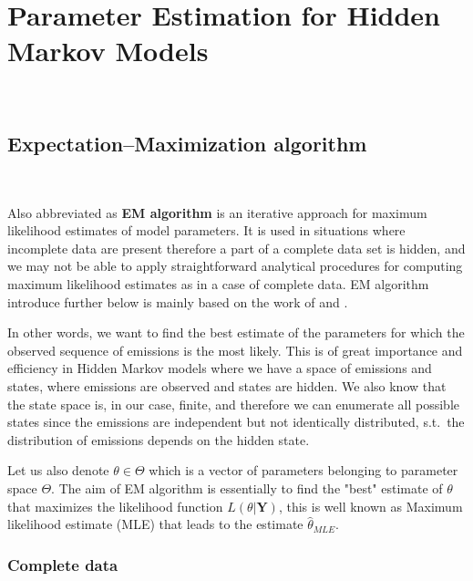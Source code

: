 
\chapter{Parameter Estimation for Hidden Markov Models}~\label{chapter:parameter_estimation}

\ifpdf
    \graphicspath{{Chapter2/Figs/Raster/}{Chapter2/Figs/PDF/}{Chapter2/Figs/}}
\else
    \graphicspath{{Chapter2/Figs/Vector/}{Chapter2/Figs/}}
\fi

\section{Expectation–Maximization algorithm}~\label{sec:EM}
 
Also abbreviated as \textbf{EM algorithm} is an iterative approach for maximum likelihood estimates of model parameters. 
It is used in situations where incomplete data are present therefore a part of a complete data set is hidden, 
and we may not be able to apply straightforward analytical procedures for computing maximum likelihood estimates as in a 
case of complete data. EM algorithm introduce further below is mainly based on the work of \citep{Dempster1977} and \citep{McLachlan2008}.

In other words, we want to find the best estimate of the parameters for which the observed sequence of emissions is the most likely. 
This is of great importance and efficiency in Hidden Markov models where we have a space of emissions and states, where  emissions 
are observed and states are hidden. We also know that the state space is, in our case, finite, and therefore we can enumerate all possible states 
since the emissions are independent but not identically distributed, s.t.\ the distribution of emissions depends on the hidden state.

Let us also denote $\theta \in \Theta$ which is a vector of parameters belonging to parameter space $\Theta$. 
The aim of EM algorithm is essentially to find the "best" estimate of $\theta$ that maximizes the likelihood function $L(\theta|\textbf{Y})$, 
this is well known as Maximum likelihood estimate (MLE) that leads to the estimate $\hat{\theta}_{MLE}$. 

\subsection*{Complete data}

